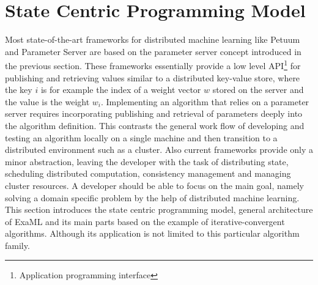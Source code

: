 
\chapter{State Centric Programming Model}
\label{c:state_centric}
Most state-of-the-art frameworks for distributed machine learning like Petuum \cite{Xing2015} and Parameter Server \cite{Li2014} are based on the parameter server concept introduced in the previous section.
These frameworks essentially provide a low level API\footnote{Application programming interface} for publishing and retrieving values similar to a distributed key-value store, where the key $i$ is for example the index of a weight vector $w$ stored on the server and the value is the weight $w_i$.
Implementing an algorithm that relies on a parameter server requires incorporating publishing and retrieval of parameters deeply into the algorithm definition.
This contrasts the general work flow of developing and testing an algorithm locally on a single machine and then transition to a distributed environment such as a cluster.
Also current frameworks provide only a minor abstraction, leaving the developer with the task of distributing state, scheduling distributed computation, consistency management and managing cluster resources.
A developer should be able to focus on the main goal, namely solving a domain specific problem by the help of distributed machine learning.
This section introduces the state centric programming model, general architecture of ExaML and its main parts based on the example of iterative-convergent algorithms.
Although its application is not limited to this particular algorithm family.

